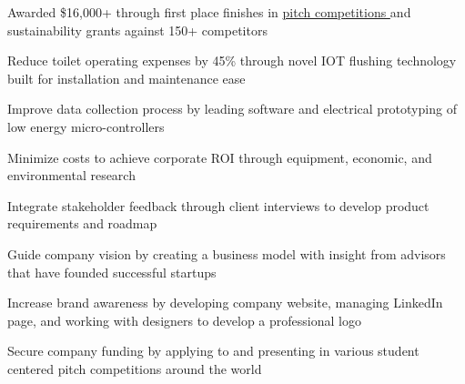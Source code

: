 \documentclass[]{jack-resume}
\begin{document}
\begin{tightemize}
    \item Awarded \$16,000+ through first place finishes in \href{https://dogood.umd.edu/research-impact/projects/do-good-challenge}{pitch competitions \ExternalLink} and sustainability grants against 150+ competitors
    \item Reduce toilet operating expenses by 45\% through novel IOT flushing technology built for installation and maintenance ease 
    \item Improve data collection process by leading software and electrical prototyping of low energy micro-controllers
    \item Minimize costs to achieve corporate ROI through equipment, economic, and environmental research 
    \item Integrate stakeholder feedback through client interviews to develop product requirements and roadmap
    \item Guide company vision by creating a business model with insight from advisors that have founded successful startups 
    \item Increase brand awareness by developing company website, managing LinkedIn page, and working with designers to develop a professional logo
    \item Secure company funding by applying to and presenting in various student centered pitch competitions around the world
\end{tightemize}
\sectionsep
\end{document}
